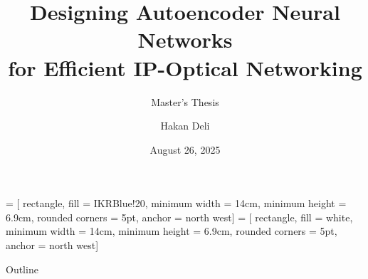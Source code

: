 \documentclass[english,aspectratio=169,dvipsnames]{beamer}
\title{Designing Autoencoder Neural Networks \\ for Efficient IP-Optical Networking}
\subtitle{Master's Thesis}
\date{August 26, 2025} %
\author{Hakan Deli}
\begin{document}
 = [  rectangle, 
                        fill = IKRBlue!20, 
                        minimum width = 14cm, 
                        minimum height = 6.9cm, 
                        rounded corners = 5pt, %
                        anchor = north west]
 = [ rectangle, 
                        fill = white, 
                        minimum width = 14cm, 
                        minimum height = 6.9cm, 
                        rounded corners = 5pt, %
                        anchor = north west]

\begin{frame}[plain]{Outline}
    \vspace{0.3cm}
    \begin{minipage}[t][1cm][t]{\linewidth}
        \setlength{\itemsep}{0cm}
        \setlength{\parskip}{3pt} 
        \tableofcontents[sectionstyle=show,subsectionstyle=show,subsubsectionstyle=hide]
    \end{minipage}
\end{frame}

\breadcrumbson

\end{document}
